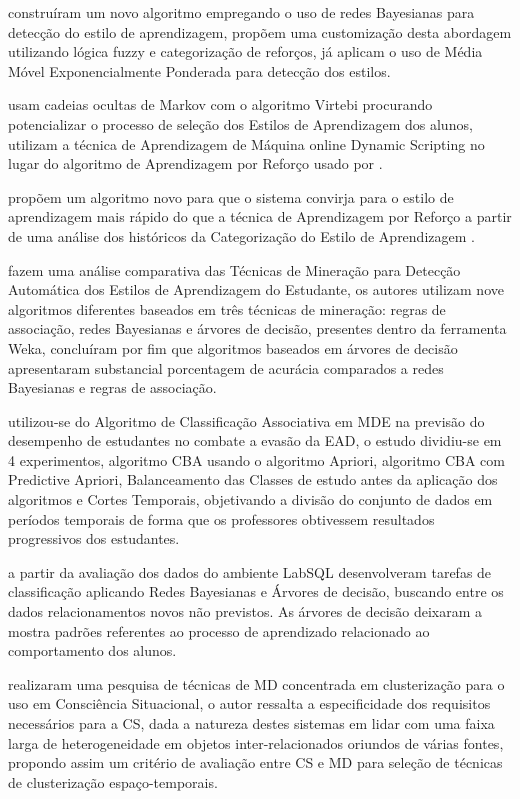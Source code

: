 \documentclass[12pt]{article}
\begin{document}
\cite{Salazar_Vivas_Luciana_2017} construíram um novo algoritmo empregando o uso de redes Bayesianas para detecção do estilo de aprendizagem, \cite{Falci_et_al_2018} propõem uma customização desta abordagem utilizando lógica fuzzy e categorização de reforços, já \cite{Ribeiro_et_al_2017} aplicam o uso de Média Móvel Exponencialmente Ponderada para detecção dos estilos.

\cite{Sena_etal_2016} usam cadeias ocultas de Markov com o algoritmo Virtebi procurando potencializar o processo de seleção dos Estilos de Aprendizagem dos alunos, \cite{Silva_etal_2017} utilizam a técnica de Aprendizagem de Máquina online Dynamic Scripting no lugar do algoritmo de Aprendizagem por Reforço usado por \cite{Dorca2012}.

\cite{Falci_et_al_2016} propõem um algoritmo novo para que o sistema convirja para o estilo de aprendizagem mais rápido do que a técnica de Aprendizagem por Reforço a partir de uma análise dos históricos da Categorização do Estilo de Aprendizagem .

\cite{Ahmad_Shamsuddin_2010} fazem uma análise comparativa das Técnicas de Mineração para Detecção Automática dos Estilos de Aprendizagem do Estudante, os autores utilizam nove algoritmos diferentes baseados em três técnicas de mineração: regras de associação, redes Bayesianas e árvores de decisão, presentes dentro da ferramenta Weka, concluíram por fim que algoritmos baseados em árvores de decisão apresentaram substancial porcentagem de acurácia comparados a redes Bayesianas e regras de associação.

\cite{Fernandes2017} utilizou-se do Algoritmo de  Classificação Associativa em MDE na previsão do desempenho de estudantes no combate a evasão da EAD, o estudo dividiu-se em 4 experimentos, algoritmo CBA usando o algoritmo Apriori, algoritmo CBA com Predictive Apriori, Balanceamento das Classes de estudo antes da aplicação dos algoritmos e Cortes Temporais, objetivando a divisão do conjunto de dados em períodos temporais de forma que os professores obtivessem resultados progressivos dos estudantes.

\cite{Dias_e_Filho_etal_2008} a partir da avaliação dos dados do ambiente LabSQL desenvolveram tarefas de classificação aplicando Redes Bayesianas e Árvores de decisão, buscando entre os dados relacionamentos novos não previstos. As árvores de decisão deixaram a mostra padrões referentes ao processo de aprendizado relacionado ao comportamento dos alunos. 

\cite{Mitsch_et_al_2013} realizaram uma pesquisa de técnicas de MD concentrada em clusterização para o uso em Consciência Situacional, o autor ressalta a especificidade dos requisitos necessários para a CS, dada a natureza destes sistemas em lidar com uma faixa larga de heterogeneidade em objetos inter-relacionados oriundos de várias fontes, propondo assim um critério de avaliação entre CS e MD para seleção de técnicas de clusterização espaço-temporais.
\end{document}
